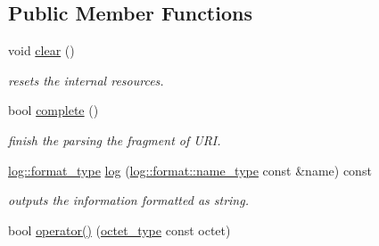 \subsection*{Public Member Functions}
\begin{DoxyCompactItemize}
\item 
\hypertarget{classhryky_1_1uri_1_1fragment_1_1_reader_afdb909677281b8b8ca12c629527bf653}{void \hyperlink{classhryky_1_1uri_1_1fragment_1_1_reader_afdb909677281b8b8ca12c629527bf653}{clear} ()}\label{classhryky_1_1uri_1_1fragment_1_1_reader_afdb909677281b8b8ca12c629527bf653}

\begin{DoxyCompactList}\small\item\em resets the internal resources. \end{DoxyCompactList}\item 
\hypertarget{classhryky_1_1uri_1_1fragment_1_1_reader_aac9af5879cfa6e49b2efb40bd3ce3309}{bool \hyperlink{classhryky_1_1uri_1_1fragment_1_1_reader_aac9af5879cfa6e49b2efb40bd3ce3309}{complete} ()}\label{classhryky_1_1uri_1_1fragment_1_1_reader_aac9af5879cfa6e49b2efb40bd3ce3309}

\begin{DoxyCompactList}\small\item\em finish the parsing the fragment of U\-R\-I. \end{DoxyCompactList}\item 
\hypertarget{classhryky_1_1uri_1_1fragment_1_1_reader_a703471465daa5bf88ad461c1a1937d55}{\hyperlink{namespacehryky_1_1log_ad50448c3f934f1eacd5c1bcffe8111e1}{log\-::format\-\_\-type} \hyperlink{classhryky_1_1uri_1_1fragment_1_1_reader_a703471465daa5bf88ad461c1a1937d55}{log} (\hyperlink{namespacehryky_1_1log_1_1format_ab7408d1e2ed2d648dbf9bba69eb74288}{log\-::format\-::name\-\_\-type} const \&name) const }\label{classhryky_1_1uri_1_1fragment_1_1_reader_a703471465daa5bf88ad461c1a1937d55}

\begin{DoxyCompactList}\small\item\em outputs the information formatted as string. \end{DoxyCompactList}\item 
\hypertarget{classhryky_1_1uri_1_1fragment_1_1_reader_a284e2e09967f3d90ecad33a7ca6e8cb6}{bool \hyperlink{classhryky_1_1uri_1_1fragment_1_1_reader_a284e2e09967f3d90ecad33a7ca6e8cb6}{operator()} (\hyperlink{namespacehryky_a488cba8b666be33ccca70e819684e3c8}{octet\-\_\-type} const octet)}\label{classhryky_1_1uri_1_1fragment_1_1_reader_a284e2e09967f3d90ecad33a7ca6e8cb6}


\end{DoxyCompactItemize}
